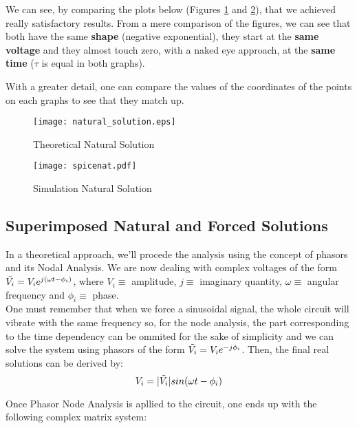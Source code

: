 We can see, by comparing the plots below (Figures \ref{fig:sub1} and \ref{fig:sub2}), that we achieved really satisfactory results. From a mere comparison of the figures, we can see that both have the same \textbf{shape} (negative exponential), they start at the \textbf{same voltage} and they almost touch zero, with a naked eye approach, at the \textbf{same time} ($\tau$ is equal in both graphs).

With a greater detail, one can compare the values of the coordinates of the points on each graphs to see that they match up.

\begin{figure}[h]
    \centering
  \texttt{[image: natural\_solution.eps]}
  \caption{Theoretical Natural Solution}
  \label{fig:sub1}
\end{figure}
\begin{figure}[h]
    \centering
  \texttt{[image: spicenat.pdf]}
  \caption{Simulation Natural Solution}
  \label{fig:sub2}
\end{figure}

\clearpage

\subsection{Superimposed Natural and Forced Solutions}
\label{subsec:general_exp}

In a theoretical approach, we'll procede the analysis using the concept of phasors and its Nodal Analysis.
We are now dealing with complex voltages of the form $\Tilde{V_i}=V_ie^{j(\omega t - {\phi}_i)}$, where $V_i\equiv$ amplitude, $j\equiv$ imaginary quantity, $\omega\equiv$ angular frequency and ${\phi}_i\equiv$ phase.\\

One must remember that when we force a sinusoidal signal, the whole circuit will vibrate with the same frequency so, for the node analysis, the part corresponding to the time dependency can be ommited for the sake of simplicity and we can solve the system using phasors of the form $\Tilde{V_i}=V_ie^{-j{\phi}_i}$. Then, the final real solutions can be derived by:
\begin{equation}
    V_i=|\Tilde{V_i}| sin(\omega t-{\phi}_i)
\end{equation}

Once Phasor Node Analysis is apllied to the circuit, one ends up with the following complex matrix system:

